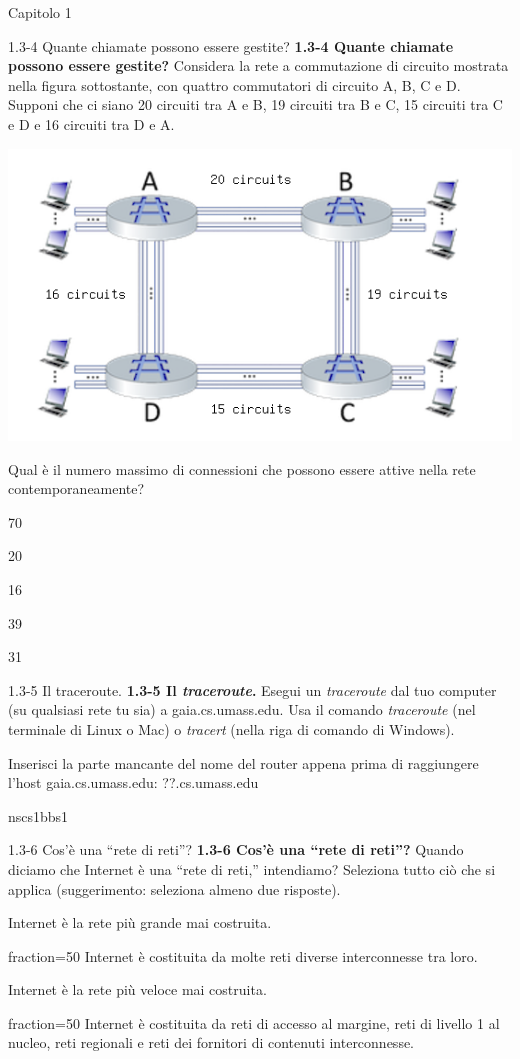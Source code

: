 \documentclass[a4paper]{article}
\begin{document}
\begin{quiz}{Capitolo 1}
\begin{multi}[points=1,shuffle=true]{1.3-4 Quante chiamate possono essere gestite?}
\textbf{1.3-4 Quante chiamate possono essere gestite?} 
Considera la rete a commutazione di circuito mostrata nella figura sottostante, con quattro commutatori di circuito A, B, C e D. Supponi che ci siano 20 circuiti tra A e B, 19 circuiti tra B e C, 15 circuiti tra C e D e 16 circuiti tra D e A. 
\begin{center}
\includegraphics[width=\linewidth]{figs/1.3.4.png}
\end{center}
Qual è il numero massimo di connessioni che possono essere attive nella rete contemporaneamente?
\item* 70
\item 20
\item 16
\item 39
\item 31
\end{multi}

\begin{shortanswer}[points=1,shuffle=true]{1.3-5 Il traceroute.}
\textbf{1.3-5 Il \textit{traceroute}.} 
Esegui un \textit{traceroute} dal tuo computer (su qualsiasi rete tu sia) a gaia.cs.umass.edu. Usa il comando \textit{traceroute} (nel terminale di Linux o Mac) o \textit{tracert} (nella riga di comando di Windows). 

Inserisci la parte mancante del nome del router appena prima di raggiungere l'host gaia.cs.umass.edu: ??.cs.umass.edu
\item nscs1bbs1
\end{shortanswer}    

\begin{multi}[points=1,shuffle=true,multiple]{1.3-6 Cos'è una ``rete di reti''?}
\textbf{1.3-6 Cos'è una ``rete di reti''?}  
Quando diciamo che Internet è una ``rete di reti,'' intendiamo? Seleziona tutto ciò che si applica (suggerimento: seleziona almeno due risposte).
\item Internet è la rete più grande mai costruita.
\item[fraction=50] Internet è costituita da molte reti diverse interconnesse tra loro.
\item Internet è la rete più veloce mai costruita.
\item[fraction=50] Internet è costituita da reti di accesso al margine, reti di livello 1 al nucleo, reti regionali e reti dei fornitori di contenuti interconnesse.
\end{multi}


\end{quiz}
\end{document}
